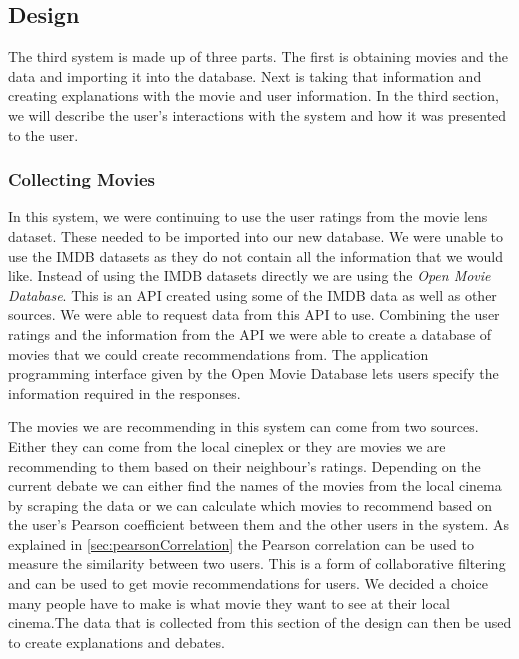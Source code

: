             \subsection{Design}

                The third system is made up of three parts. The first is obtaining movies and the data and importing it into the database. Next is taking that information and creating explanations with the movie and user information. In the third section, we will describe the user's interactions with the system and how it was presented to the user.


                \subsubsection{Collecting Movies}
                    In this system, we were continuing to use the user ratings from the movie lens dataset. These needed to be imported into our new database. We were unable to use the IMDB datasets as they do not contain all the information that we would like. Instead of using the IMDB datasets directly we are using the \textit{Open Movie Database}. This is an API created using some of the IMDB data as well as other sources. We were able to request data from this API to use. Combining the user ratings and the information from the API we were able to create a database of movies that we could create recommendations from. The application programming interface given by the Open Movie Database lets users specify the information required in the responses. 

                    The movies we are recommending in this system can come from two sources. Either they can come from the local cineplex or they are movies we are recommending to them based on their neighbour's ratings. Depending on the current debate we can either find the names of the movies from the local cinema by scraping the data or we can calculate which movies to recommend based on the user's Pearson coefficient between them and the other users in the system. As explained in \ref{sec:pearsonCorrelation} the Pearson correlation can be used to measure the similarity between two users. This is a form of collaborative filtering and can be used to get movie recommendations for users. We decided a choice many people have to make is what movie they want to see at their local cinema.The data that is collected from this section of the design can then be used to create explanations and debates.


